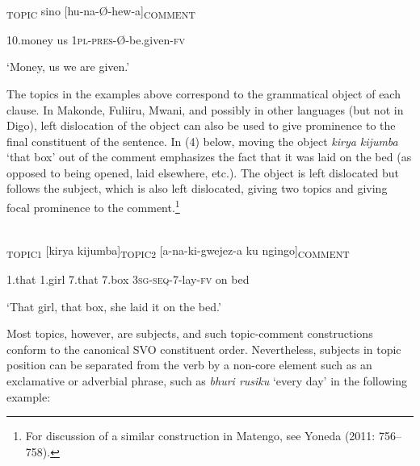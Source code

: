 \documentclass[output=paper]{langsci/langscibook}
\begin{document}
\ea\label{ex:}
\\
\gll [Pesa]\textsubscript{TOPIC} sino [hu-na-Ø-hew-a]\textsubscript{COMMENT}\\
\begin{styleUntitledi}
10.money us \textsc{1pl-pres}{}-Ø-be.given-\textsc{fv}
\end{styleUntitledi}

\glt \textup{‘}\textup{Money, us we are given.’}
\z

The topics in the examples above correspond to the grammatical object of each clause. In Makonde, Fuliiru, Mwani, and possibly in other languages (but not in Digo), left dislocation of the object can also be used to give prominence to the final constituent of the sentence. In (4) below, moving the object \textit{kirya kijumba} ‘that box’ out of the comment emphasizes the fact that it was laid on the bed (as opposed to being opened, laid elsewhere, etc.). The object is left dislocated but follows the subject, which is also left dislocated, giving two topics and giving focal prominence to the comment.\footnote{For discussion of a similar construction in Matengo, see Yoneda (2011: 756–758).}

\ea\label{ex:}
\\
\textsubscript{TOPIC1} [kirya kijumba]\textsubscript{TOPIC2} [a-na-ki-gwejez-a ku ngingo]\textsubscript{COMMENT}\\
\begin{styleUntitledi}
1.that 1.girl 7.that 7.box \textsc{3sg-seq}{}-7-lay-\textsc{fv }on bed
\end{styleUntitledi}

\glt \textup{‘}\textup{That girl, that box, she laid it on the bed.’}
\z

Most topics, however, are subjects, and such topic-comment constructions conform to the canonical SVO constituent order. Nevertheless, subjects in topic position can be separated from the verb by a non-core element such as an exclamative or adverbial phrase, such as \textit{bhuri rusiku} ‘every day’ in the following example:
\end{document}
